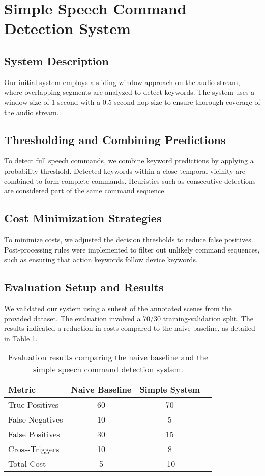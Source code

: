 \section{Simple Speech Command Detection System}
\subsection{System Description}
Our initial system employs a sliding window approach on the audio stream, where overlapping segments are analyzed to detect keywords. The system uses a window size of 1 second with a 0.5-second hop size to ensure thorough coverage of the audio stream.

\subsection{Thresholding and Combining Predictions}
To detect full speech commands, we combine keyword predictions by applying a probability threshold. Detected keywords within a close temporal vicinity are combined to form complete commands. Heuristics such as consecutive detections are considered part of the same command sequence.

\subsection{Cost Minimization Strategies}
To minimize costs, we adjusted the decision thresholds to reduce false positives. Post-processing rules were implemented to filter out unlikely command sequences, such as ensuring that action keywords follow device keywords.

\subsection{Evaluation Setup and Results}
We validated our system using a subset of the annotated scenes from the provided dataset. The evaluation involved a 70/30 training-validation split. The results indicated a reduction in costs compared to the naive baseline, as detailed in Table \ref{tab:simple_system_results}.

\begin{table}[h]
\centering
\begin{tabular}{lccc}
\toprule
Metric & Naive Baseline & Simple System \\
\midrule
True Positives & 60 & 70 \\
False Negatives & 10 & 5 \\
False Positives & 30 & 15 \\
Cross-Triggers & 10 & 8 \\
Total Cost & 5 & -10 \\
\bottomrule
\end{tabular}
\caption{Evaluation results comparing the naive baseline and the simple speech command detection system.}
\label{tab:simple_system_results}
\end{table}
